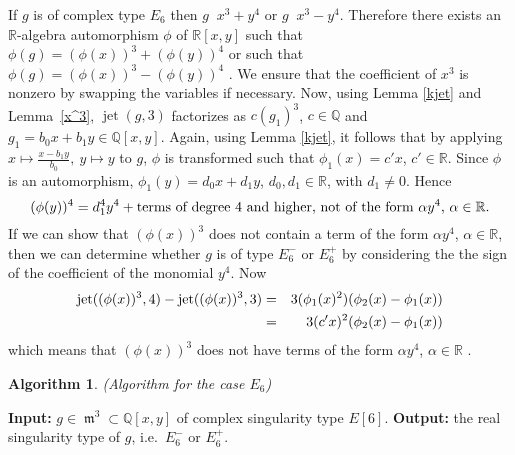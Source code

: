 \documentclass{amsproc}
\DeclareMathOperator{\requiv}{\overset{r}{\sim}}
\DeclareMathOperator{\m}{\mathfrak{m}}
\DeclareMathOperator{\jt}{jet}
\begin{document}
If $g$ is of complex type $E_6$ then $g\requiv x^3+y^4$ or $g\requiv x^3-y^4$. Therefore there exists an $\mathbb
R$-algebra automorphism $\phi$ of $\mathbb R[x,y]$ such that
$\phi(g)=(\phi(x))^3+(\phi(y))^4$ or such that
$\phi(g)=(\phi(x))^3-(\phi(y))^4$ . We ensure that the
coefficient of
$x^3$ is nonzero by swapping the variables if necessary. Now, using Lemma
\ref{kjet} and Lemma~\ref{x^3}, $\jt(g,3)$ factorizes as
$c(g_1)^3$, $c\in\mathbb Q$ and $g_1=b_0x+b_1y\in\mathbb
Q[x,y]$. Again,
using Lemma \ref{kjet}, it follows that by applying $x\mapsto\frac{x-b_1y}{b_0},\
y\mapsto y$ to $g$, $\phi$ is transformed such that $\phi_1(x)=c'x$, $c'\in\mathbb
R$. Since $\phi$ is an automorphism, $\phi_1(y)=d_0x+d_1y$, $d_0,d_1\in\mathbb R$,
with $d_1\neq 0$. Hence
\begin{equation*}
(\phi(y))^4=d_1^4y^4+\textnormal{terms of degree 4 and higher, not of the
form $\alpha y^4$, $\alpha\in\mathbb R$.}
\end{equation*}
If we can show that $(\phi(x))^3$ does not contain a term of the form
$\alpha y^4$, $\alpha\in\mathbb R$, then we can determine whether $g$
is of type $E_6^-$ or $E_6^+$ by considering the the sign of the coefficient of the monomial $y^4$. Now
\begin{eqnarray*}
\textnormal{jet}((\phi(x))^3,4)-\textnormal{jet}((\phi(x))^3,3)&=&3(\phi_1(x)^2)(\phi_2(x)-\phi_1(x))\\&=&3(c'x)^2(\phi_2(x)-\phi_1(x))
\end{eqnarray*}
 which means that $(\phi(x))^3$ does not have terms of the form $\alpha y^4$,
 $\alpha\in\mathbb R$ .
\newtheorem{E[6]}[kjet]{Algorithm}
\begin{E[6]}(Algorithm for the case $E_6$)\label{E[6]}
\end{E[6]}
\noindent\textnormal{\bf Input:} $g\in \m^3\subset\mathbb Q[x,y]$ of complex
singularity type $E[6]$.\newline
\textnormal{\bf Output:} the real singularity type of $g$, i.e.~$E_6^-$
or $E_6^+$.
\end{document}
